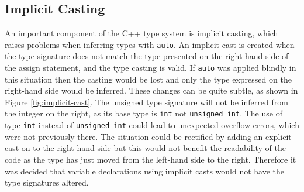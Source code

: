 \documentclass[bsc,frontabs,singlespacing,twoside,parskip,deptreport]{infthesis}
\begin{document}


\subsection{Implicit Casting} \label{sect:con-impl-cast}
An important component of the C++ type system is implicit casting, which raises problems when inferring types with \texttt{auto}. An implicit cast is created when the type signature does not match the type presented on the right-hand side of the assign statement, and the type casting is valid. If \texttt{auto} was applied blindly in this situation then the casting would be lost and only the type expressed on the right-hand side would be inferred. These changes can be quite subtle, as shown in Figure \ref{fig:implicit-cast}. The unsigned type signature will not be inferred from the integer on the right, as its base type is \texttt{int} not \texttt{unsigned int}. The use of type \texttt{int} instead of \texttt{unsigned int} could lead to unexpected overflow errors, which were not previously there. The situation could be rectified by adding an explicit cast on to the right-hand side but this would not benefit the readability of the code as the type has just moved from the left-hand side to the right. Therefore it was decided that variable declarations using implicit casts would not have the type signatures altered.   
\end{document}
